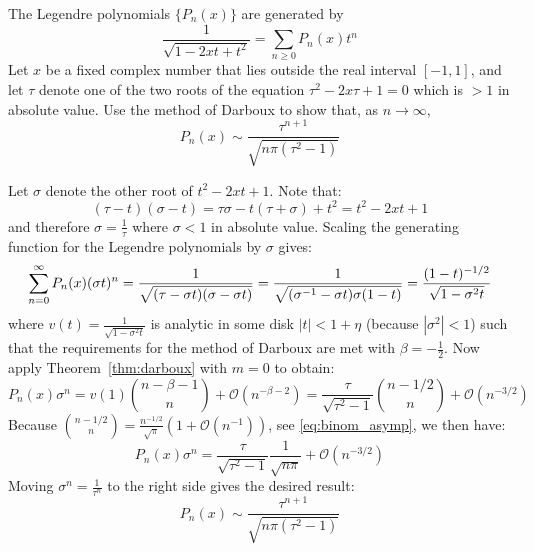 \begin{exercise}
    \label{ex:5-2}
    The Legendre polynomials $\{P_n(x)\}$ are generated by
    \[
        \frac{1}{\sqrt{1-2xt+t^2}} = \sum_{n\geq0} P_n(x)t^n
    \]
    Let $x$ be a fixed complex number that lies outside the real interval $[-1,1]$, and let $\tau$ denote one of the two roots of the equation $\tau^2-2x\tau+1=0$ which is $>1$ in absolute value. Use the method of Darboux to show that, as $n\to \infty$,
    \[
        P_n(x)\sim \frac{\tau^{n+1}}{\sqrt{n\pi(\tau^2-1)}}
    \]
\end{exercise}
\begin{solution}
    Let $\sigma$ denote the other root of $t^2 - 2xt + 1$. Note that:
    \[
        (\tau - t)(\sigma - t) = \tau\sigma -t(\tau + \sigma) + t^2 = t^2 - 2xt + 1
    \]
    and therefore $\sigma = \frac{1}{\tau}$ where $\sigma < 1$ in absolute value. Scaling the generating function for the Legendre polynomials by $\sigma$ gives:
    \[
        \bsum[n] P_n(x) (\sigma t)^n = \frac{1}{\sqrt{(\tau - \sigma t) (\sigma - \sigma t)}} = \frac{1}{\sqrt{(\sigma^{-1} - \sigma t)\sigma(1-t)}} = \frac{(1-t)^{-1/2}}{\sqrt{1-\sigma^2t}} 
    \]
    where $v(t) = \frac{1}{\sqrt{1-\sigma^2t}}$ is analytic in some disk $|t| < 1+\eta$ (because $|\sigma^2| < 1$) such that the requirements for the method of Darboux are met with $\beta = -\frac{1}{2}$. Now apply Theorem~\ref{thm:darboux} with $m=0$ to obtain:
    \[
        P_n(x)\sigma^n = v(1) \binom{n-\beta-1}{n} + \mathcal{O}(n^{-\beta-2}) = \frac{\tau}{\sqrt{\tau^2-1}}\binom{n-1/2}{n} + \mathcal{O}(n^{-3/2})
    \]
    Because $\binom{n-1/2}{n} = \frac{n^{-1/2}}{\sqrt{\pi}}\left(1+ \mathcal{O}(n^{-1})\right)$, see \eqref{eq:binom_asymp}, we then have:
    \[
        P_n(x)\sigma^n = \frac{\tau}{\sqrt{\tau^2-1}} \frac{1}{\sqrt{n\pi}} + \mathcal{O}(n^{-3/2})
    \]
    Moving $\sigma^n = \frac{1}{\tau^n}$ to the right side gives the desired result:
    \[
        P_n(x)\sim \frac{\tau^{n+1}}{\sqrt{n\pi(\tau^2-1)}}
    \]
\end{solution}

